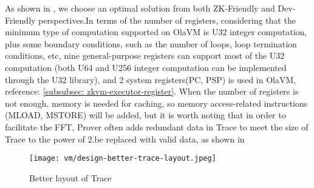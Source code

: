 As shown in , we choose an optimal solution from both ZK-Friendly and Dev-Friendly perspectives.In terms of the number of
registers, considering that the minimum type of computation supported on OlaVM is U32 integer computation, plus some boundary conditions,
such as the number of loops, loop termination conditions, etc, nine general-purpose registers can support most of the U32 computation
(both U64 and U256 integer computation can be implemented through the U32 library), and 2 system registers(PC, PSP) is used in OlaVM, reference: \ref{subsubsec: zkvm-executor-register}. 
When the number of registers is not enough, memory is needed for caching, so memory access-related instructions
(MLOAD, MSTORE) will be added, but it is worth noting that in order to facilitate the FFT, Prover often adds redundant data in Trace to meet
the size of Trace to the power of 2.be replaced with valid data, as shown in 

\begin{figure}[!ht]
    \centering
    \texttt{[image: vm/design-better-trace-layout.jpeg]}
    \caption{Better layout of Trace}
    \label{fig:design-better-trace-layout}
\end{figure}